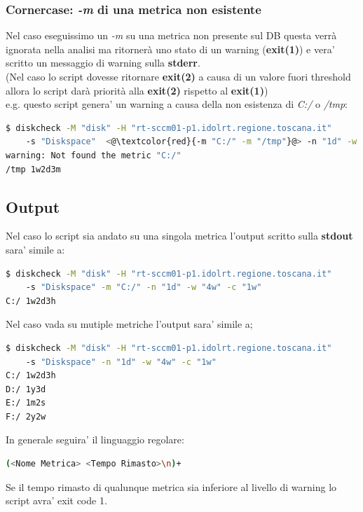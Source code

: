 \documentclass{article}
\begin{document}
\subsubsection*{Cornercase: \textit{-m} di una metrica non esistente}
Nel caso eseguissimo un \textit{-m} su una metrica non presente sul DB questa verrà ignorata nella analisi ma ritornerà uno stato di un warning (\textbf{exit(1)}) e vera' scritto un messaggio di warning sulla \textbf{stderr}.\\
(Nel caso lo script dovesse ritornare \textbf{exit(2)} a causa di un valore fuori threshold allora lo script darà priorità alla \textbf{exit(2)} rispetto al \textbf{exit(1)})
\\
e.g. questo script genera' un warning a causa della non esistenza di \textit{C:/} o \textit{/tmp}: 
\begin{lstlisting}[language=Bash]
$ diskcheck -M "disk" -H "rt-sccm01-p1.idolrt.regione.toscana.it" 
    -s "Diskspace"  <@\textcolor{red}{-m "C:/" -m "/tmp"}@> -n "1d" -w "4w" -c "1w"
warning: Not found the metric "C:/"
/tmp 1w2d3m
\end{lstlisting}



\clearpage

\subsection{Output}
Nel caso lo script sia andato su una singola metrica l'output scritto sulla \textbf{stdout} sara' simile a:
\begin{lstlisting}[language=Bash]
$ diskcheck -M "disk" -H "rt-sccm01-p1.idolrt.regione.toscana.it" 
    -s "Diskspace" -m "C:/" -n "1d" -w "4w" -c "1w"
C:/ 1w2d3h
\end{lstlisting}
Nel caso vada su mutiple metriche l'output sara' simile a;

\begin{lstlisting}[language=Bash]
$ diskcheck -M "disk" -H "rt-sccm01-p1.idolrt.regione.toscana.it" 
    -s "Diskspace" -n "1d" -w "4w" -c "1w"
C:/ 1w2d3h
D:/ 1y3d
E:/ 1m2s
F:/ 2y2w
\end{lstlisting}

In generale seguira' il linguaggio regolare:

\begin{lstlisting}[language=Bash]
(<Nome Metrica> <Tempo Rimasto>\n)+
\end{lstlisting}

Se il tempo rimasto di qualunque metrica sia inferiore al livello di warning lo script avra' exit code 1.
\end{document}
